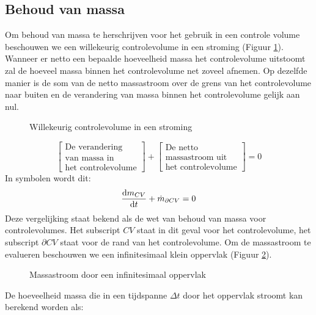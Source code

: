 			\subsection{Behoud van massa}
			\label{sec:Behoud van massa}
Om behoud van massa te herschrijven voor het gebruik in een controle volume beschouwen we een willekeurig controlevolume in een stroming (Figuur \ref{fig:controlevolume in stroming}). Wanneer er netto een bepaalde hoeveelheid massa het controlevolume uitstoomt zal de hoeveel massa binnen het controlevolume net zoveel afnemen. Op dezelfde manier is de som van de netto massastroom over de grens van het controlevolume naar buiten en de verandering van massa binnen het controlevolume gelijk aan nul.
\begin{figure}[htb]
	\centering
	
	\caption{Willekeurig controlevolume in een stroming}
	\label{fig:controlevolume in stroming}
\end{figure}
\begin{equation}
	\left[
		\begin{array}{c}
			\mbox{De verandering} \\ \mbox{van massa in} \\ \mbox{het controlevolume}
		\end{array}
	\right]
	+
	\left[
		\begin{array}{c}
			\mbox{De netto} \\ \mbox{massastroom uit} \\ \mbox{het controlevolume}
		\end{array}
	\right]
	= 0
	\label{eqn:controlevolume,behoud van massa,woorden}
\end{equation}
In symbolen wordt dit:
\begin{equation}
	\frac{\mathrm{d} m_{CV}}{\mathrm{d} t} + \dot{m}_{\partial CV} = 0
	\label{eqn:controlevolume,behoud van massa}
\end{equation}
Deze vergelijking staat bekend als de wet van behoud van massa voor controlevolumes. Het subscript $CV$ staat in dit geval voor het controlevolume, het subscript $\partial CV$ staat voor de rand van het controlevolume.
Om de massastroom te evalueren beschouwen we een infinitesimaal klein oppervlak (Figuur \ref{fig:massastroom}).
\begin{figure}[htb]
	\centering
	
	\caption{Massastroom door een infinitesimaal oppervlak}
	\label{fig:massastroom}
\end{figure}
De hoeveelheid massa die in een tijdspanne $\Delta t$ door het oppervlak stroomt kan berekend worden als:
